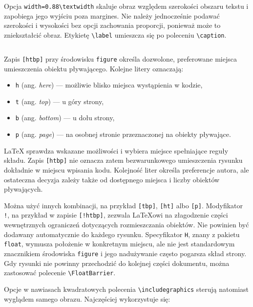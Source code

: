 Opcja \verb|width=0.88\textwidth| skaluje obraz względem szerokości obszaru tekstu i zapobiega jego wyjściu poza margines. Nie należy jednocześnie podawać szerokości i wysokości bez opcji zachowania proporcji, ponieważ może to zniekształcić obraz. Etykietę \verb|\label| umieszcza się po poleceniu \verb|\caption|.

\subsection{}

Zapis \verb|[htbp]| przy środowisku \texttt{figure} określa dozwolone, preferowane miejsca umieszczenia obiektu pływającego. Kolejne litery oznaczają:

\begin{itemize}
  \item \texttt{h} (ang. \emph{here}) — możliwie blisko miejsca wystąpienia w kodzie,
  \item \texttt{t} (ang. \emph{top}) — u góry strony,
  \item \texttt{b} (ang. \emph{bottom}) — u dołu strony,
  \item \texttt{p} (ang. \emph{page}) — na osobnej stronie przeznaczonej na obiekty pływające.
\end{itemize}

LaTeX sprawdza wskazane możliwości i wybiera miejsce spełniające reguły składu. Zapis \verb|[htbp]| nie oznacza zatem bezwarunkowego umieszczenia rysunku dokładnie w miejscu wpisania kodu. Kolejność liter określa preferencje autora, ale ostateczna decyzja zależy także od dostępnego miejsca i liczby obiektów pływających.

Można użyć innych kombinacji, na przykład \verb|[tbp]|, \verb|[ht]| albo \verb|[p]|. Modyfikator \texttt{!}, na przykład w zapisie \verb|[!htbp]|, zezwala LaTeXowi na złagodzenie części wewnętrznych ograniczeń dotyczących rozmieszczania obiektów. Nie powinien być dodawany automatycznie do każdego rysunku. Specyfikator \texttt{H}, znany z pakietu \texttt{float}, wymusza położenie w konkretnym miejscu, ale nie jest standardowym znacznikiem środowiska \texttt{figure} i jego nadużywanie często pogarsza skład strony. Gdy rysunki nie powinny przechodzić do kolejnej części dokumentu, można zastosować polecenie \verb|\FloatBarrier|.

Opcje w nawiasach kwadratowych polecenia \verb|\includegraphics| sterują natomiast wyglądem samego obrazu. Najczęściej wykorzystuje się:

